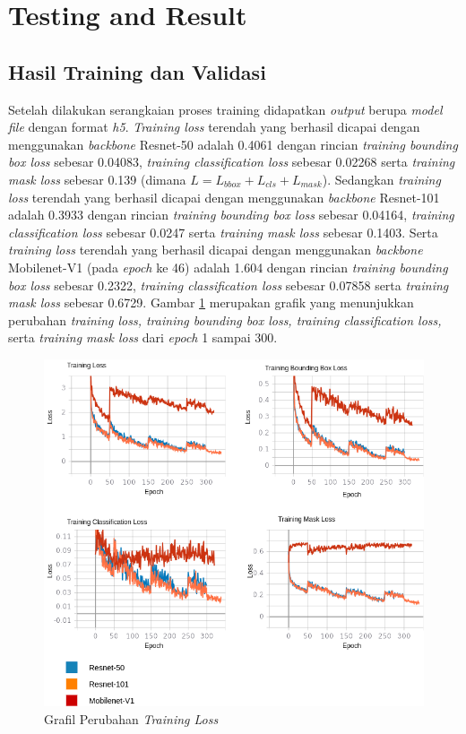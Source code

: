 \documentclass[conference]{IEEEtran}
\begin{document}
	
	\section{Testing and Result}
	
	\subsection{Hasil Training dan Validasi}
	\vspace{1ex}
	
	Setelah dilakukan serangkaian proses training didapatkan \textit{output} berupa \textit{model file}  dengan format \textit{h5}. \textit{Training loss} terendah yang berhasil dicapai dengan menggunakan \textit{backbone} Resnet-50 adalah 0.4061 dengan rincian \textit{training bounding box loss} sebesar 0.04083, \textit{training classification loss} sebesar 0.02268 serta \textit{training mask loss} sebesar 0.139 (dimana $L=L_{bbox}+L_{cls}+L_{mask}$). Sedangkan \textit{training loss} terendah yang berhasil dicapai dengan menggunakan \textit{backbone} Resnet-101 adalah 0.3933 dengan rincian \textit{training bounding box loss} sebesar 0.04164, \textit{training classification loss} sebesar 0.0247 serta \textit{training mask loss} sebesar 0.1403. Serta  \textit{training loss} terendah yang berhasil dicapai dengan menggunakan \textit{backbone} Mobilenet-V1 (pada \textit{epoch} ke 46) adalah 1.604 dengan rincian \textit{training bounding box loss} sebesar 0.2322, \textit{training classification loss} sebesar 0.07858 serta \textit{training mask loss} sebesar 0.6729. Gambar \ref{training-result} merupakan grafik yang menunjukkan perubahan \textit{training loss, training bounding box loss, training classification loss,} serta \textit{training mask loss} dari \textit{epoch} 1 sampai 300.
	
	\begin{figure}[h]
		\centering
		\includegraphics[scale=0.3]{img/training.png}
		\caption{Grafil Perubahan \textit{Training Loss}}
		\label{training-result}
	\end{figure} 
\end{document}
